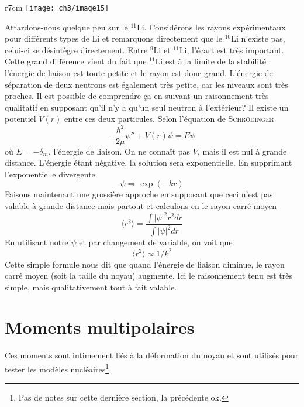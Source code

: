 	\begin{wrapfigure}[10]{r}{7cm}
	\vspace{-5mm}
	\texttt{[image: ch3/image15]}
	\end{wrapfigure}
Attardons-nous quelque peu sur le $^{11}$Li. Considérons les rayons expérimentaux pour différents types de
Li et remarquons directement que le $^{10}$Li n'existe pas, celui-ci se désintègre directement. Entre 
$^9$Li et $^{11}$Li, l'écart est très important. Cette grand différence vient du fait que $^{11}$Li est à la
limite de la stabilité : l'énergie de liaison est toute petite et le rayon est donc grand. L'énergie de 
séparation de deux neutrons est également très petite, car les niveaux sont très proches. Il est possible de
comprendre ça en suivant un raisonnement très qualitatif en supposant qu'il n'y a qu'un seul neutron à 
l'extérieur? Il existe un potentiel $V(r)$ entre ces deux particules. Selon l'équation de \textsc{Schrödinger}
\begin{equation}
-\frac{\hbar^2}{2\mu}\psi'' + V(r)\psi = E\psi
\end{equation}
où $E=-\delta_m$, l'énergie de liaison. On ne connaît pas $V$, mais il est nul à grande distance. L'énergie étant
négative, la solution sera exponentielle. En supprimant l'exponentielle divergente
\begin{equation}
\psi \Rightarrow \exp(-kr)
\end{equation}
Faisons maintenant une grossière approche en supposant que ceci n'est pas valable à grande distance mais partout
et calculons-en le rayon carré moyen 
\begin{equation}
\langle r^2\rangle = \dfrac{\int |\psi|^2r^2 dr}{\int |\psi|^2 dr}
\end{equation}
En utilisant notre $\psi$ et par changement de variable, on voit que 
\begin{equation}
\langle r^2\rangle \propto 1/k^2
\end{equation}
Cette simple formule nous dit que quand l'énergie de liaison diminue, le rayon carré moyen (soit la taille du 
noyau) augmente. Ici le raisonnement tenu est très simple, mais qualitativement tout à fait valable.

\newpage
\section{Moments multipolaires}
Ces moments sont intimement liés à la déformation du noyau et sont utilisés pour tester les modèles 
nucléaires\footnote{Pas de notes sur cette dernière section, la précédente ok.}

